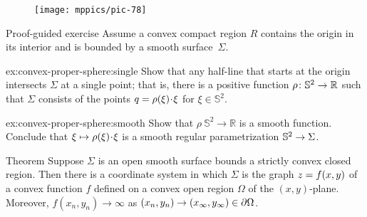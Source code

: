 {

\begin{wrapfigure}[8]{r}{33 mm}
\vskip-6mm
\centering
\texttt{[image: mppics/pic-78]}
\end{wrapfigure}

\begin{thm}{Proof-guided exercise}\label{ex:convex-proper-sphere}
Assume a convex compact region $R$ contains the origin in its interior and is bounded by a smooth surface~$\Sigma$.

\begin{subthm}{ex:convex-proper-sphere:single}
Show that any half-line that starts at the origin intersects $\Sigma$ at a single point;
that is, there is a positive function $\rho\:\mathbb{S}^2\z\to\mathbb{R}$ such that $\Sigma$ consists of the points $q\z=\rho(\xi)\cdot \xi$ for $\xi\in \mathbb{S}^2$.
\end{subthm}

\begin{subthm}{ex:convex-proper-sphere:smooth}
Show that $\rho\:\mathbb{S}^2\to\mathbb{R}$ is a smooth function.
Conclude that $\xi\z\mapsto \rho(\xi)\cdot \xi$ is a smooth regular parametrization $\mathbb{S}^2\z\to \Sigma$.
\end{subthm}

\end{thm}

}

\begin{thm}{Theorem}\label{thm:convex-open}
Suppose $\Sigma$ is an open smooth surface bounds a strictly convex closed region.
Then there is a coordinate system in which $\Sigma$ is the graph $z\z=f(x,y)$ of a convex function $f$ defined on a convex open region $\Omega$ of the $(x,y)$-plane.
Moreover, $f(x_n,y_n)\to\infty$ as $(x_n,y_n)\to(x_\infty,y_\infty)\z\in \partial\Omega$.

\end{thm}

